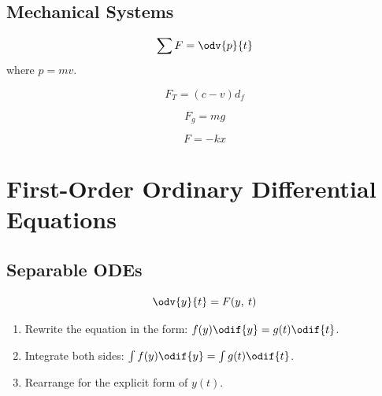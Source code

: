 \documentclass{article}
\begin{document}
\subsection{Mechanical Systems}
\begin{theorem}
    \begin{equation*}
        \sum F = \odv{p}{t}
    \end{equation*}
    where \(p = mv\).
\end{theorem}
\begin{theorem}
    \begin{equation*}
        F_T = (c - v) d_f
    \end{equation*}
\end{theorem}
\begin{theorem}
    \begin{equation*}
        F_g = mg
    \end{equation*}
\end{theorem}
\begin{theorem}
    \begin{equation*}
        F = -kx
    \end{equation*}
\end{theorem}
\section{First-Order Ordinary Differential Equations}
\subsection{Separable ODEs}
\begin{equation*}
    \odv{y}{t} = F(y,\: t)
\end{equation*}
\begin{enumerate}
    \item Rewrite the equation in the form: \(f(y)\odif{y} = g(t)\odif{t}\).
    \item Integrate both sides: \(\int f(y)\odif{y} = \int g(t)\odif{t}\).
    \item Rearrange for the explicit form of \(y(t)\).
\end{enumerate}
\end{document}
